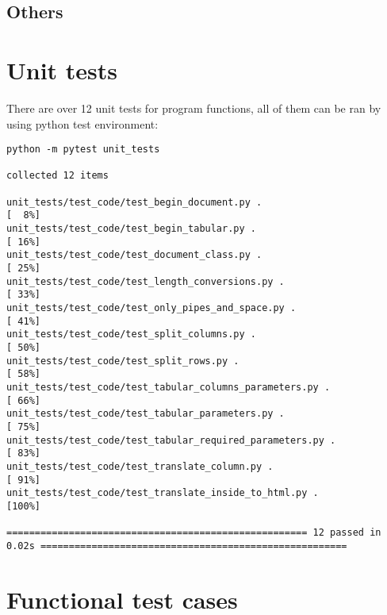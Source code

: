 \documentclass[12pt]{article}
\begin{document}
\subsection{Others}
\section{Unit tests}
There are over 12 unit tests  for program functions, all of them can be ran by using python test environment:
\begin{lstlisting}
python -m pytest unit_tests

collected 12 items                                                                                                            

unit_tests/test_code/test_begin_document.py .                                                                           [  8%]
unit_tests/test_code/test_begin_tabular.py .                                                                            [ 16%]
unit_tests/test_code/test_document_class.py .                                                                           [ 25%]
unit_tests/test_code/test_length_conversions.py .                                                                       [ 33%]
unit_tests/test_code/test_only_pipes_and_space.py .                                                                     [ 41%]
unit_tests/test_code/test_split_columns.py .                                                                            [ 50%]
unit_tests/test_code/test_split_rows.py .                                                                               [ 58%]
unit_tests/test_code/test_tabular_columns_parameters.py .                                                               [ 66%]
unit_tests/test_code/test_tabular_parameters.py .                                                                       [ 75%]
unit_tests/test_code/test_tabular_required_parameters.py .                                                              [ 83%]
unit_tests/test_code/test_translate_column.py .                                                                         [ 91%]
unit_tests/test_code/test_translate_inside_to_html.py .                                                                 [100%]

===================================================== 12 passed in 0.02s ======================================================
\end{lstlisting}
\section{Functional test cases}
\end{document}
